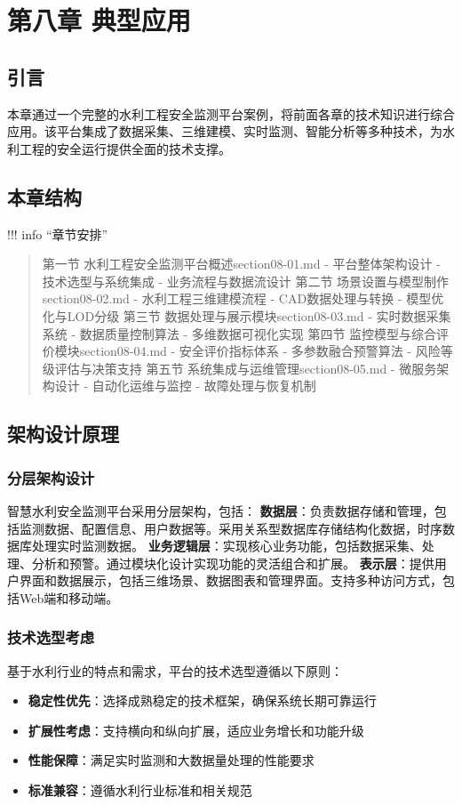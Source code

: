 \section{第八章 典型应用}\label{ux7b2cux516bux7ae0-ux5178ux578bux5e94ux7528} \learningobjectives{
}\subsection{引言}\label{ux5f15ux8a00}
本章通过一个完整的水利工程安全监测平台案例，将前面各章的技术知识进行综合应用。该平台集成了数据采集、三维建模、实时监测、智能分析等多种技术，为水利工程的安全运行提供全面的技术支撑。
\subsection{本章结构}\label{ux672cux7ae0ux7ed3ux6784} !!! info ``章节安排'' \begin{quote}
 第一节 水利工程安全监测平台概述section08-01.md
- 平台整体架构设计 - 技术选型与系统集成 - 业务流程与数据流设计 第二节 场景设置与模型制作section08-02.md - 水利工程三维建模流程 - CAD数据处理与转换 - 模型优化与LOD分级 第三节
数据处理与展示模块section08-03.md - 实时数据采集系统 - 数据质量控制算法 - 多维数据可视化实现 第四节 监控模型与综合评价模块section08-04.md - 安全评价指标体系 - 多参数融合预警算法
- 风险等级评估与决策支持 第五节 系统集成与运维管理section08-05.md - 微服务架构设计 - 自动化运维与监控 - 故障处理与恢复机制 
\end{quote}
\subsection{架构设计原理}\label{ux67b6ux6784ux8bbeux8ba1ux539fux7406}
\subsubsection{分层架构设计}\label{ux5206ux5c42ux67b6ux6784ux8bbeux8ba1} 智慧水利安全监测平台采用分层架构，包括：
\textbf{数据层}：负责数据存储和管理，包括监测数据、配置信息、用户数据等。采用关系型数据库存储结构化数据，时序数据库处理实时监测数据。
\textbf{业务逻辑层}：实现核心业务功能，包括数据采集、处理、分析和预警。通过模块化设计实现功能的灵活组合和扩展。
\textbf{表示层}：提供用户界面和数据展示，包括三维场景、数据图表和管理界面。支持多种访问方式，包括Web端和移动端。
\subsubsection{技术选型考虑}\label{ux6280ux672fux9009ux578bux8003ux8651} 基于水利行业的特点和需求，平台的技术选型遵循以下原则： \begin{itemize}
\tightlist \item \textbf{稳定性优先}：选择成熟稳定的技术框架，确保系统长期可靠运行 \item \textbf{扩展性考虑}：支持横向和纵向扩展，适应业务增长和功能升级 \item
\textbf{性能保障}：满足实时监测和大数据量处理的性能要求 \item \textbf{标准兼容}：遵循水利行业标准和相关规范 \end{itemize}
